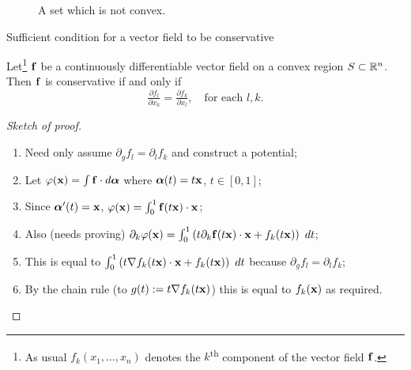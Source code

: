 \begin{figure}
    \caption{A set which is not convex.}
\end{figure}







{Sufficient condition for a vector field to be conservative}


\begin{theorem}
    Let\footnote{As usual  \(  f_k(x_1,\ldots,x_n)\) denotes the \(k\)\textsuperscript{th} component of the vector field \(\mathbf{f}\).} \(\mathbf{f}\) be a continuously differentiable vector field on a convex region \(S\subset \mathbb{R}^n\).
    Then \(\mathbf{f}\) is conservative if and only if
    \[
        \tfrac{\partial f_l}{\partial x_k} = \tfrac{\partial f_k}{\partial x_l},
        \quad \text{for each \(l,k\)}.
    \]
\end{theorem}



\begin{proof}[Sketch of proof]
    \begin{enumerate}
        \item Need only assume \(\partial_g f_l = \partial_l f_k\) and construct a potential;
        \item Let \(\varphi(\mathbf{x}) = \int \mathbf{f} \cdot d\boldsymbol{\alpha}\) where \(\boldsymbol{\alpha}(t) = t\mathbf{x}\), \(t\in[0,1]\);
        \item Since \(\boldsymbol{\alpha}'(t) = \mathbf{x}\), \(\varphi(\mathbf{x}) = \int_0^1 \mathbf{f}(t\mathbf{x})\cdot \mathbf{x}\);
        \item Also (needs proving) \(\partial_k  \varphi(\xx) = \int_{0}^{1} \left( t \partial_k \ff(t\xx) \cdot \xx + f_k(t\xx) \right) \ dt\);
        \item This is equal to \(\int_{0}^{1} \left( t \nabla f_k(t\mathbf{x}) \cdot \mathbf{x} + f_k(t\mathbf{x}) \right) \ dt\) because  \(\partial_g f_l = \partial_l f_k\);
        \item By the chain rule (to \(g(t):= t \nabla f_k(t\mathbf{x}) \)) this is equal to \(f_k(\mathbf{x})\) as required.
    \end{enumerate}

\end{proof}




